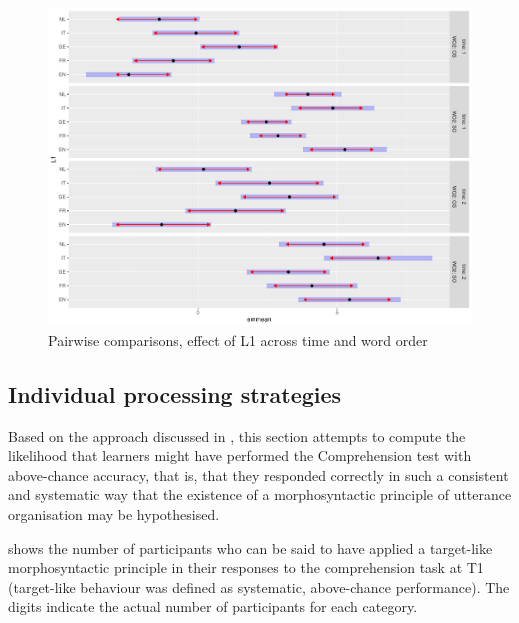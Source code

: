 \begin{figure}[p]
    \includegraphics[height=.4\textheight]{figures/05-4.pdf}
    \caption{Pairwise comparisons, effect of L1 across time and word order}
    \label{fig:05:4}
\end{figure}
\clearpage

\subsection{Individual processing strategies}\label{sec:05:2.3}

Based on the approach discussed in , this section attempts to compute the likelihood that learners might have performed the Comprehension test with above-chance accuracy, that is, that they responded correctly in such a consistent and systematic way that the existence of a morphosyntactic principle of utterance organisation may be hypothesised.

 shows the number of participants who can be said to have applied a target-like morphosyntactic principle in their responses to the comprehension task at T1 (target-like behaviour was defined as systematic, above-chance performance). The digits indicate the actual number of participants for each category.

